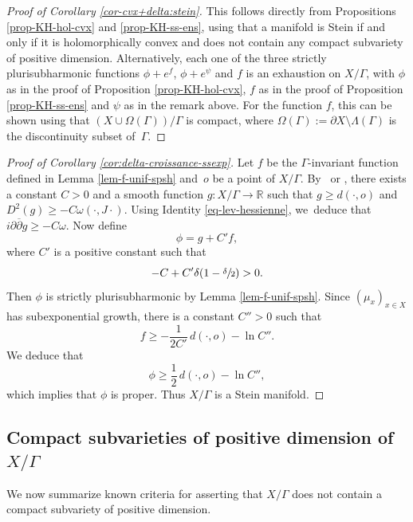 \documentclass[JEP,XML,SOM,Unicode,NoEqCountersInSection,published]{cedram}
\theoremstyle{definition}
\newcommand{\R}{\mathbb{R}}
\begin{document}
\begin{proof}[Proof of Corollary \ref{cor-cvx+delta:stein}]
This follows directly from Propositions \ref{prop-KH-hol-cvx} and \ref{prop-KH-ss-ens}, using that a manifold is Stein if and only if it is holomorphically convex and does not contain any compact subvariety of positive dimension. Alternatively, each one of the three strictly plurisubharmonic functions $\phi+e^{f}$, $\phi+e^{\psi}$ and $f$ is an exhaustion on $X/\Gamma$, with $\phi$ as in the proof of Proposition \ref{prop-KH-hol-cvx}, $f$ as in the proof of Proposition \ref{prop-KH-ss-ens} and $\psi$ as in the remark above. For the function $f$, this can be shown using that $(X\cup\Omega(\Gamma))/\Gamma$ is compact, where $\Omega(\Gamma):= \partial X\setminus \Lambda(\Gamma)$ is the discontinuity subset of~$\Gamma$.
\end{proof}

\begin{proof}[Proof of Corollary \ref{cor:delta-croissance-ssexp}]
Let $f$ be the $\Gamma$\nobreakdash-invariant function defined in Lemma \ref{lem-f-unif-spsh} and~$o$ be a point of $X/\Gamma$. By~\cite{tamExhaustionFunctionsComplete2010} or \cite[\S4 of Ch.\,26]{chowRicciFlowTechniques2010}, there exists a constant $C>0$ and a smooth function $g:X/\Gamma \to \R$ such that $g\ge d(\cdot,o)$ and \hbox{$D^{2}(g)\ge -C\omega(\cdot,J\cdot)$}. Using Identity \eqref{eq-lev-hessienne}, we~deduce that $i\partial\overline{\partial}g\ge -C\omega$. Now define
\begin{equation*}
\phi = g + C'f,
\end{equation*}
where $C'$ is a positive constant such that
\begin{equation*}
-C+C'\delta(1-\sfrac{\delta}{2})>0.
\end{equation*}
Then $\phi$ is strictly plurisubharmonic by Lemma \ref{lem-f-unif-spsh}. Since $(\mu_x)_{x\in X}$ has subexponential growth, there is a constant $C''>0$ such that
\begin{equation*}
f\ge -\frac{1}{2C'}\,d(\cdot,o) -\ln C''.
\end{equation*}
We deduce that
\begin{equation*}
\phi \ge \frac{1}{2}\,d(\cdot,o) -\ln C'',
\end{equation*}
which implies that $\phi$ is proper. Thus $X/\Gamma$ is a Stein manifold.
\end{proof}

\subsection{Compact subvarieties of positive dimension of $X/\Gamma$}\label{ss-section-criteres}
We now summarize known criteria for asserting that $X/\Gamma$ does not contain a compact subvariety of positive dimension.
\end{document}
